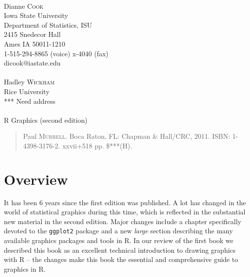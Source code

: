 \documentclass[12pt]{article}
\begin{document}
\noindent [Reviewers]\\ 
Dianne \textsc{Cook} \\ 
Iowa State University \\ 
Department of Statistics, ISU \\ 
2415 Snedecor Hall \\ 
Ames IA 50011-1210 \\ 
1-515-294-8865 (voice) x-4040 (fax) \\ 
dicook@iastate.edu \\ 
\\
Hadley \textsc{Wickham} \\
Rice University \\
*** Need address\\

\noindent [Book \#***]\\ 
{\Large\sf R Graphics (second edition)}
\begin{quotation}\noindent
 Paul \textsc{Murrell}.  
Boca Raton, FL: Chapman \& Hall/CRC, 2011.  ISBN: 1-4398-3176-2. xxvii+518 pp. \$***(H).  
\end{quotation}\vspace{12pt}

\setlength{\baselineskip}{20pt}

\section{Overview}

It has been 6 years since the first edition was published. A lot has
changed in the world of statistical graphics during this time, which
is reflected in the substantial new material in the second
edition. Major changes include a chapter specifically devoted to the
\texttt{ggplot2} package and a new {\em large} section describing the
many available graphics packages and tools in R.  In our
review of the first book we described this book as an excellent
technical introduction to drawing graphics with R -- the changes make
this book the essential and comprehensive guide to graphics in R.


\end{document}
